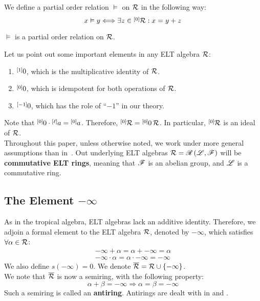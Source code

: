 We define a partial order relation $\vDash$ on $\R$ in the following way:
$$x\vDash y\Longleftrightarrow \exists z\in\zeroset{\R}:x=y+z$$

\begin{lem}[{\cite[Lemma 0.4]{BS}}]
$\vDash$ is a partial order relation on $\R$.
\end{lem}

Let us point out some important elements in any ELT algebra $\R$:
\begin{enumerate}
\item $\layer{0}{1}$, which is the multiplicative identity of $\R$.
\item $\layer{0}{0}$, which is idempotent for both operations of $\R$.
\item $\layer{0}{-1}$, which has the role of ``$-1$'' in our theory.
\end{enumerate}

Note that $\zero\cdot\layer{a}{\ell}=\layer{a}{0}$. Therefore, $\zeroset{\R}=\zero\,\R$. In particular, $\zeroset{\R}$ is an ideal of $\R$.\\

Throughout this paper, unless otherwise noted, we work under more general assumptions than in~\cite{BS}. Out underlying ELT algebras $\R=\ELT{\F}{\L}$ will be \textbf{commutative ELT rings}, meaning that $\F$ is an abelian group, and $\L$ is a commutative ring.

\subsection{The Element $-\infty$}\label{sub:the-element-minf}

As in the tropical algebra, ELT algebras lack an additive identity. Therefore, we adjoin a formal element to the ELT algebra $\R$, denoted by $-\infty$, which satisfies $\forall\alpha\in\R$:
$$\begin{array}{c}
-\infty+\alpha=\alpha+-\infty=\alpha\\
-\infty\cdot\alpha=\alpha\cdot-\infty=-\infty
\end{array}$$
We also define $s\left(-\infty\right)=0$. We denote $\overline{\R}=\R\cup\left\{-\infty\right\}$.\\

We note that $\overline{\R}$ is now a semiring, with the following property:
$$\alpha+\beta=-\infty\Longrightarrow\alpha=\beta=-\infty$$
Such a semiring is called an \textbf{antiring}. Antirings are dealt with in \cite{Tan2007} and \cite{Dolzan2008}.

